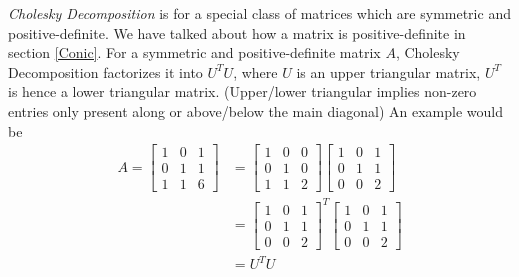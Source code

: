 \textit{Cholesky Decomposition} is for a special class of matrices which are symmetric and positive-definite. We have talked about how a matrix is positive-definite in section \ref{Conic}. For a symmetric and positive-definite matrix $A$, Cholesky Decomposition factorizes it into $U^TU$, where $U$ is an upper triangular matrix, $U^T$ is hence a lower triangular matrix. (Upper/lower triangular implies non-zero entries only present along or above/below the main diagonal) An example would be
\begin{align*}
A = 
\begin{bmatrix}
1 & 0 & 1 \\
0 & 1 & 1 \\
1 & 1 & 6
\end{bmatrix}
&=
\begin{bmatrix}
1 & 0 & 0 \\
0 & 1 & 0 \\
1 & 1 & 2
\end{bmatrix}
\begin{bmatrix}
1 & 0 & 1 \\
0 & 1 & 1 \\
0 & 0 & 2
\end{bmatrix} \\
&= 
\begin{bmatrix}
1 & 0 & 1 \\
0 & 1 & 1 \\
0 & 0 & 2
\end{bmatrix}^T
\begin{bmatrix}
1 & 0 & 1 \\
0 & 1 & 1 \\
0 & 0 & 2
\end{bmatrix} \\
&= U^TU 
\end{align*}

